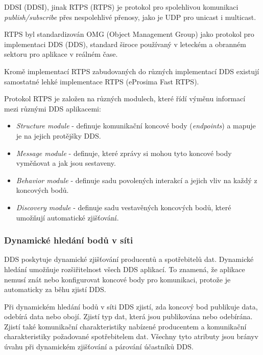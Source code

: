 \acs{DDSI} (\acl{DDSI}), jinak \acs{RTPS} (\acl{RTPS}) je protokol pro spolehlivou komunikaci \textit{publish/subscribe} přes nespolehlivé přenosy, jako je UDP pro unicast i multicast. \cite{DDS_Standard}

\acs{RTPS} byl standardizován OMG (Object Management Group) jako protokol pro implementaci \acl{DDS} (\acs{DDS}), standard široce používaný v leteckém a obranném sektoru pro aplikace v reálném čase.

Kromě implementací \acs{RTPS} zabudovaných do různých implementací \acs{DDS} existují samostatné lehké implementace \acs{RTPS} (eProsima Fast \acs{RTPS}).

Protokol RTPS je založen na různých modulech, které řídí výměnu informací mezi různými \acs{DDS} aplikacemi: \cite{Eprosima}

\begin{itemize}
    \item \textit{Structure module} - definuje komunikační koncové body (\textit{endpoints}) a mapuje je na jejich protějšky \acs{DDS}.
    \item \textit{Message module} - definuje, které zprávy si mohou tyto koncové body vyměňovat a jak jsou sestaveny.
    \item \textit{Behavior module} - definuje sadu povolených interakcí a jejich vliv na každý z koncových bodů.
    \item \textit{Discovery module} - definuje sadu vestavěných koncových bodů, které umožňují automatické zjišťování.
\end{itemize}

\subsubsection{Dynamické hledání bodů v síti}

\acs{DDS} poskytuje dynamické zjišťování producentů a spotřebitelů dat. Dynamické hledání umožňuje rozšiřitelnost všech \acs{DDS} aplikací. To znamená, že aplikace nemusí znát nebo konfigurovat koncové body pro komunikaci, protože je automaticky za běhu zjistí \acs{DDS}.

Při dynamickém hledání bodů v síti \acs{DDS} zjistí, zda koncový bod publikuje data, odebírá data nebo obojí. Zjistí typ dat, která jsou publikována nebo odebírána. Zjistí také komunikační charakteristiky nabízené producentem a komunikační charakteristiky požadované spotřebitelem dat. Všechny tyto atributy jsou brány\break v úvahu při dynamickém zjišťování a párování účastníků \acs{DDS}. \cite{DDS_Main}

